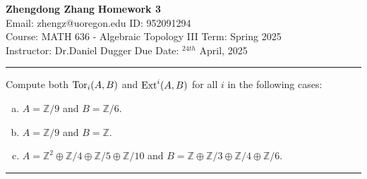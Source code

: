 \documentclass[a4paper, 12pt]{article}
\begin{document}
\noindent
\large\textbf{Zhengdong Zhang} \hfill \textbf{Homework 3}   \\
Email: zhengz@uoregon.edu \hfill ID: 952091294 \\
\normalsize Course: MATH 636 - Algebraic Topology III \hfill Term: Spring 2025\\
Instructor: Dr.Daniel Dugger \hfill Due Date: $^{24th}$ April, 2025 \\
\noindent\rule{7in}{2.8pt}

\begin{problem}{1}
Compute both \(\text{Tor}_i(A,B)\) and \(\text{Ext}^i(A,B)\) for all \(i\) in the following cases: 
\begin{enumerate}[(a)]
\item \(A=\mathbb{Z}/9\) and \(B=\mathbb{Z}/6\).
\item \(A=\mathbb{Z}/9\) and \(B=\mathbb{Z}\).
\item \(A=\mathbb{Z}^2\oplus \mathbb{Z}/4\oplus \mathbb{Z}/5\oplus \mathbb{Z}/10\) and \(B=\mathbb{Z}\oplus \mathbb{Z}/3\oplus \mathbb{Z}/4\oplus \mathbb{Z}/6\).
\end{enumerate}
\end{problem}
\begin{solution}

\end{solution}

\noindent\rule{7in}{2.8pt}


\end{document}
